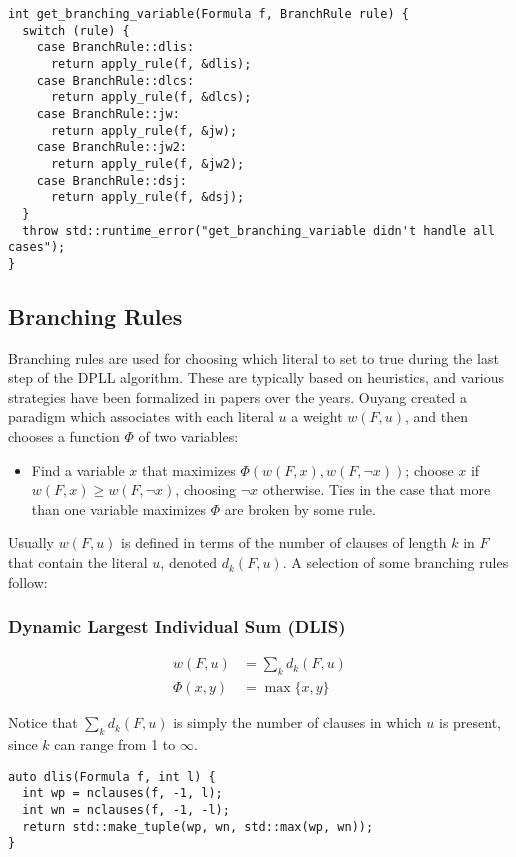 \documentclass[10pt,AMS Euler]{article}
\begin{document}
\begin{verbatim}
int get_branching_variable(Formula f, BranchRule rule) {
  switch (rule) {
    case BranchRule::dlis:
      return apply_rule(f, &dlis);
    case BranchRule::dlcs:
      return apply_rule(f, &dlcs);
    case BranchRule::jw:
      return apply_rule(f, &jw);
    case BranchRule::jw2:
      return apply_rule(f, &jw2);
    case BranchRule::dsj:
      return apply_rule(f, &dsj);
  }
  throw std::runtime_error("get_branching_variable didn't handle all cases");
}
\end{verbatim}

\subsection*{Branching Rules}
\label{sec:org26f6a89}
Branching rules are used for choosing which literal to set to true during
the last step of the DPLL algorithm. These are typically based on heuristics,
and various strategies have been formalized in papers over the years.
Ouyang \cite{ouyang} created a paradigm which associates with each literal \(u\) a weight \(w(F, u)\),
and then chooses a function \(\Phi\) of two variables:
\begin{itemize}
\item Find a variable \(x\) that maximizes \(\Phi(w(F,x), w(F, \neg x))\); choose \(x\) if
\(w(F, x) \geq w(F,\neg x)\), choosing \(\neg x\) otherwise. Ties in the case that more
than one variable maximizes \(\Phi\) are broken by some rule.
\end{itemize}

Usually \(w(F,u)\) is defined in terms of the number of clauses of length \(k\) in \(F\) that contain the
literal \(u\), denoted \(d_k(F, u)\). A selection of some branching rules follow:
\subsubsection*{Dynamic Largest Individual Sum (DLIS)}
\label{sec:org4e68b9e}
\begin{align*}
w(F,u) &= \sum_k d_k(F,u) \\
\Phi(x,y) &= \max\{x,y\}
\end{align*}

Notice that \(\sum_k d_k(F,u)\) is simply the number of clauses in which \(u\) is present,
since \(k\) can range from 1 to \(\infty\).
\begin{verbatim}
auto dlis(Formula f, int l) {
  int wp = nclauses(f, -1, l);
  int wn = nclauses(f, -1, -l);
  return std::make_tuple(wp, wn, std::max(wp, wn));
}
\end{verbatim}
\end{document}
